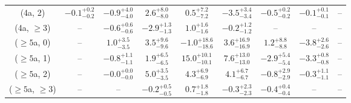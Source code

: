 \begin{table}[h!]
{\begin{tabular}{ccccccccc}
	(4a, 2) & $-0.1^{+ 0.2 }_{- 0.2 }$ & $-0.9^{+ 4.0 }_{- 4.0 }$ & $2.6^{+ 8.0 }_{- 8.0 }$ & $0.5^{+ 7.2 }_{- 7.2 }$ & $-3.5^{+ 3.4 }_{- 3.4 }$ & $-0.5^{+ 0.2 }_{- 0.2 }$ & $-0.1^{+ 0.1 }_{- 0.1 }$ & -- \\[0.5ex] 
	(4a, $\ge3$) & -- & $-0.6^{+ 0.6 }_{- 0.6 }$ & $-2.9^{+ 1.3 }_{- 1.3 }$ & $1.0^{+ 1.6 }_{- 1.6 }$ & $-0.2^{+ 1.2 }_{- 1.2 }$ & -- & -- & -- \\[0.5ex] 
	($\ge5$a, 0) & -- & $1.0^{+ 3.5 }_{- 3.5 }$ & $3.5^{+ 9.6 }_{- 9.6 }$ & $-1.0^{+ 18.6 }_{- 18.6 }$ & $3.6^{+ 16.9 }_{- 16.9 }$ & $1.2^{+ 8.8 }_{- 8.8 }$ & $-3.8^{+ 2.6 }_{- 2.6 }$ & -- \\[0.5ex] 
	($\ge5$a, 1) & -- & $-0.8^{+ 1.1 }_{- 1.1 }$ & $1.9^{+ 6.5 }_{- 6.5 }$ & $15.0^{+ 10.1 }_{- 10.1 }$ & $7.6^{+ 13.0 }_{- 13.0 }$ & $-2.9^{+ 5.4 }_{- 5.4 }$ & $-3.3^{+ 0.8 }_{- 0.8 }$ & -- \\[0.5ex] 
	($\ge5$a, 2) & -- & $-0.0^{+ 0.0 }_{- 0.0 }$ & $5.0^{+ 3.5 }_{- 3.5 }$ & $4.3^{+ 6.9 }_{- 6.9 }$ & $4.1^{+ 6.7 }_{- 6.7 }$ & $-0.8^{+ 2.9 }_{- 2.9 }$ & $-0.3^{+ 1.1 }_{- 1.1 }$ & -- \\[0.5ex] 
	($\ge5$a, $\ge3$) & -- & -- & $-0.2^{+ 0.5 }_{- 0.5 }$ & $0.7^{+ 1.8 }_{- 1.8 }$ & $-0.3^{+ 2.3 }_{- 2.3 }$ & $-0.4^{+ 0.4 }_{- 0.4 }$ & -- & -- \\[0.5ex] 
	\hline
	\hline
\end{tabular}}
\end{table}
